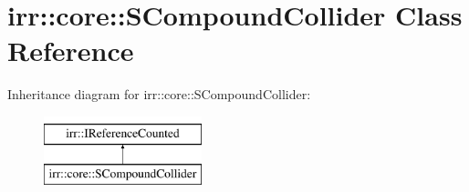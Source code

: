 \hypertarget{classirr_1_1core_1_1SCompoundCollider}{}\section{irr\+:\+:core\+:\+:S\+Compound\+Collider Class Reference}
\label{classirr_1_1core_1_1SCompoundCollider}
Inheritance diagram for irr\+:\+:core\+:\+:S\+Compound\+Collider\+:\begin{figure}[H]
\begin{center}
\leavevmode
\includegraphics[height=2.000000cm]{classirr_1_1core_1_1SCompoundCollider}
\end{center}
\end{figure}
